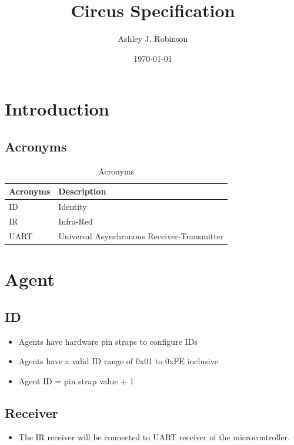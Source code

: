 \documentclass[a4paper]{article}
\title{Circus Specification}
\author{Ashley J. Robinson}
\date{\today}
\begin{document}
\maketitle

\section{Introduction}

   \subsection{Acronyms} 
      \begin{table}[h]
         \centering
         \caption{Acronyms}
         \label{tab_acronyms}
         \begin{tabular}{|l|l|}
            \hline
            \textbf{Acronyms}    &  \textbf{Description}                         \\ \hline  
            ID                   &  Identity                                     \\ \hline
            IR                   &  Infra-Red                                    \\ \hline
            UART                 &  Universal Asynchronous Receiver-Transmitter  \\ \hline  
         \end{tabular}
\end{table}  


\section{Agent}

   \subsection{ID}
      \begin{itemize}
         \item Agents have hardware pin straps to configure IDs
         \item Agents have a valid ID range of 0x01 to 0xFE inclusive
         \item Agent ID = pin strap value + 1
      \end{itemize}
   
   \subsection{Receiver}
      \begin{itemize}
         \item The IR receiver will be connected to UART receiver of the microcontroller. 
      \end{itemize}
\end{document}
